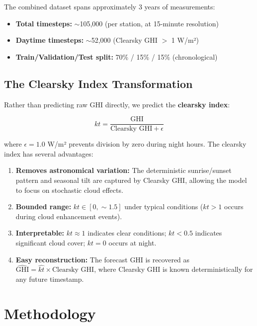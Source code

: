 \documentclass[11pt,a4paper]{article}
\begin{document}
The combined dataset spans approximately 3 years of measurements:

\begin{itemize}[noitemsep]
    \item \textbf{Total timesteps:} $\sim$105,000 (per station, at 15-minute resolution)
    \item \textbf{Daytime timesteps:} $\sim$52,000 (Clearsky GHI $>$ 1 W/m²)
    \item \textbf{Train/Validation/Test split:} 70\% / 15\% / 15\% (chronological)
\end{itemize}

\subsection{The Clearsky Index Transformation}

Rather than predicting raw GHI directly, we predict the \textbf{clearsky index}:

\begin{equation}
    kt = \frac{\text{GHI}}{\text{Clearsky GHI} + \epsilon}
\end{equation}

where $\epsilon = 1.0$ W/m² prevents division by zero during night hours. The clearsky index has several advantages:

\begin{enumerate}[noitemsep]
    \item \textbf{Removes astronomical variation:} The deterministic sunrise/sunset pattern and seasonal tilt are captured by Clearsky GHI, allowing the model to focus on stochastic cloud effects.
    \item \textbf{Bounded range:} $kt \in [0, \sim1.5]$ under typical conditions ($kt > 1$ occurs during cloud enhancement events).
    \item \textbf{Interpretable:} $kt \approx 1$ indicates clear conditions; $kt < 0.5$ indicates significant cloud cover; $kt = 0$ occurs at night.
    \item \textbf{Easy reconstruction:} The forecast GHI is recovered as $\hat{\text{GHI}} = \hat{kt} \times \text{Clearsky GHI}$, where Clearsky GHI is known deterministically for any future timestamp.
\end{enumerate}

\section{Methodology}
\label{sec:methodology}
\end{document}

